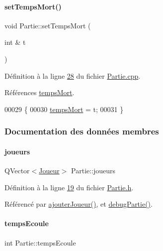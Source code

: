 \paragraph{\texorpdfstring{set\+Temps\+Mort()}{setTempsMort()}}
{\footnotesize\ttfamily void Partie\+::set\+Temps\+Mort (\begin{DoxyParamCaption}\item[{int \&}]{t }\end{DoxyParamCaption})}



Définition à la ligne \hyperlink{_partie_8cpp_source_l00028}{28} du fichier \hyperlink{_partie_8cpp_source}{Partie.\+cpp}.



Références \hyperlink{_partie_8h_source_l00021}{temps\+Mort}.


\begin{DoxyCode}
00029 \{
00030     \hyperlink{class_partie_a55a5e6e0b757d74fa9aceefa7228ead9}{tempsMort} = t;
00031 \}
\end{DoxyCode}


\subsubsection{Documentation des données membres}
\mbox{\label{class_partie_a98fa2810599b3eb46d57df2b5836a3f4}} 
\paragraph{\texorpdfstring{joueurs}{joueurs}}
{\footnotesize\ttfamily Q\+Vector$<$\hyperlink{class_joueur}{Joueur}$>$ Partie\+::joueurs\hspace{0.3cm}{\ttfamily [private]}}



Définition à la ligne \hyperlink{_partie_8h_source_l00019}{19} du fichier \hyperlink{_partie_8h_source}{Partie.\+h}.



Référencé par \hyperlink{_partie_8cpp_source_l00038}{ajouter\+Joueur()}, et \hyperlink{_partie_8cpp_source_l00045}{debug\+Partie()}.

\mbox{\label{class_partie_a58664212ddb4954a59298f1de8256477}} 
\paragraph{\texorpdfstring{temps\+Ecoule}{tempsEcoule}}
{\footnotesize\ttfamily int Partie\+::temps\+Ecoule\hspace{0.3cm}{\ttfamily [private]}}



